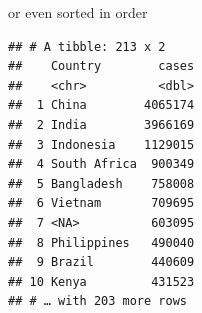 \documentclass[
  ignorenonframetext,
]{beamer}
\newenvironment{Shaded}{\begin{snugshade}}{\end{snugshade}}
\newcommand{\DataTypeTok}[1]{\textcolor[rgb]{0.13,0.29,0.53}{#1}}
\newcommand{\KeywordTok}[1]{\textcolor[rgb]{0.13,0.29,0.53}{\textbf{#1}}}
\newcommand{\NormalTok}[1]{#1}
\newcommand{\OperatorTok}[1]{\textcolor[rgb]{0.81,0.36,0.00}{\textbf{#1}}}
\newcommand{\StringTok}[1]{\textcolor[rgb]{0.31,0.60,0.02}{#1}}
\begin{document}
\begin{frame}[fragile]{or even sorted in order}
\protect\hypertarget{or-even-sorted-in-order}{}

\begin{Shaded}
\end{Shaded}

\begin{verbatim}
## # A tibble: 213 x 2
##    Country        cases
##    <chr>          <dbl>
##  1 China        4065174
##  2 India        3966169
##  3 Indonesia    1129015
##  4 South Africa  900349
##  5 Bangladesh    758008
##  6 Vietnam       709695
##  7 <NA>          603095
##  8 Philippines   490040
##  9 Brazil        440609
## 10 Kenya         431523
## # … with 203 more rows
\end{verbatim}

\end{frame}
\end{document}
